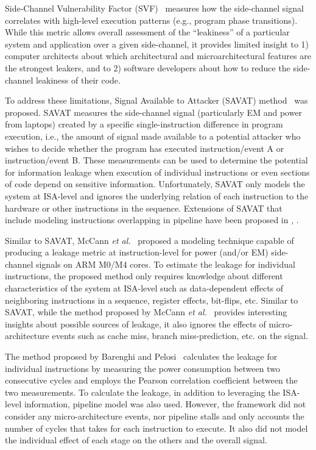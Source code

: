 \documentclass[11 pt]{article}
\begin{document}
Side-Channel Vulnerability Factor (SVF)~\cite{Demme:2013:FOM:2485922.2485970} measures how the side-channel signal correlates with
high-level execution patterns (e.g., program phase transitions).
While this metric allows overall assessment of the
``leakiness'' of a particular system and application over a
given side-channel, it provides limited insight to 1) computer
architects about which architectural and microarchitectural
features are the strongest leakers, and to 2) software developers
about how to reduce the side-channel leakiness of their
code.

To address these limitations, Signal Available to Attacker (SAVAT) method~\cite{Callan:2014:PMM:2742155.2742179} was proposed. SAVAT measures the side-channel signal (particularly EM and power from laptops) created by a specific single-instruction difference
in program execution, i.e., the amount of signal made available
to a potential attacker who wishes to decide whether the
program has executed instruction/event A or instruction/event B. These measurements can be used
to determine the potential for information leakage when
execution of individual instructions or even sections of code
depend on sensitive information. Unfortunately, SAVAT only models the system at ISA-level and ignores the underlying relation of each instruction to the hardware or other instructions in the sequence. Extensions of SAVAT that include modeling instructions overlapping in pipeline have been proposed in \cite{baki17}, \cite{Baki_2020a}.

Similar to SAVAT, McCann \textit{et al.}~\cite{McCann:2017:TPT:3241189.3241207} proposed a modeling technique capable of
producing a leakage metric at instruction-level for power (and/or
EM) side-channel signals on ARM M0/M4 cores. To estimate the leakage for individual instructions, the proposed method  only requires knowledge about different characteristics of the system at ISA-level such as data-dependent effects of neighboring
instructions in a sequence, register effects, bit-flips, etc. Similar to SAVAT, while the method proposed by McCann \textit{et al.}~\cite{McCann:2017:TPT:3241189.3241207} provides interesting insights about possible sources of leakage, it also ignores the effects of micro-architecture events such as cache miss, branch miss-prediction, etc. on the signal.

The method proposed by Barenghi and Pelosi~\cite{Barenghi:2018:SSS:3195970.3196112} calculates the leakage for individual instructions by measuring the power consumption between two consecutive cycles and employs the Pearson correlation coefficient between the two measurements. To calculate the leakage, in addition to leveraging the ISA-level information, pipeline model was also used. However, the framework did not consider any micro-architecture events, nor pipeline stalls and only accounts the number of cycles that takes for each instruction to execute. It also did not model the individual effect of each stage on the others and the overall signal.
\end{document}
